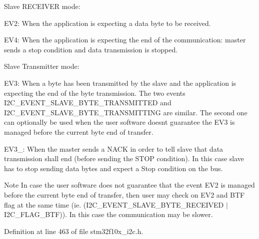 \begin{DoxyItemize}
\item Slave R\+E\+C\+E\+I\+V\+ER mode\+:
\begin{DoxyItemize}
\item E\+V2\+: When the application is expecting a data byte to be received.
\item E\+V4\+: When the application is expecting the end of the communication\+: master sends a stop condition and data transmission is stopped.
\end{DoxyItemize}
\item Slave Transmitter mode\+:
\begin{DoxyItemize}
\item E\+V3\+: When a byte has been transmitted by the slave and the application is expecting the end of the byte transmission. The two events I2\+C\+\_\+\+E\+V\+E\+N\+T\+\_\+\+S\+L\+A\+V\+E\+\_\+\+B\+Y\+T\+E\+\_\+\+T\+R\+A\+N\+S\+M\+I\+T\+T\+ED and I2\+C\+\_\+\+E\+V\+E\+N\+T\+\_\+\+S\+L\+A\+V\+E\+\_\+\+B\+Y\+T\+E\+\_\+\+T\+R\+A\+N\+S\+M\+I\+T\+T\+I\+NG are similar. The second one can optionally be used when the user software doesn\textquotesingle{}t guarantee the E\+V3 is managed before the current byte end of transfer.
\item E\+V3\+\_\+: When the master sends a N\+A\+CK in order to tell slave that data transmission shall end (before sending the S\+T\+OP condition). In this case slave has to stop sending data bytes and expect a Stop condition on the bus.
\end{DoxyItemize}

\begin{DoxyNote}{Note}
In case the user software does not guarantee that the event E\+V2 is managed before the current byte end of transfer, then user may check on E\+V2 and B\+TF flag at the same time (ie. (I2\+C\+\_\+\+E\+V\+E\+N\+T\+\_\+\+S\+L\+A\+V\+E\+\_\+\+B\+Y\+T\+E\+\_\+\+R\+E\+C\+E\+I\+V\+ED $\vert$ I2\+C\+\_\+\+F\+L\+A\+G\+\_\+\+B\+TF)). In this case the communication may be slower. 
\end{DoxyNote}

\end{DoxyItemize}

Definition at line 463 of file stm32f10x\+\_\+i2c.\+h.

